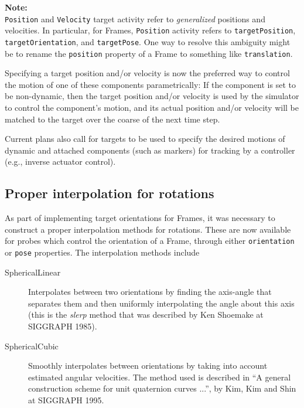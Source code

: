 \documentclass{article}
\begin{document}
\begin{sideblock}
{\bf Note:}\\
{\tt Position} and {\tt Velocity} target activity refer to {\it generalized} positions
and velocities. In particular, for Frames, {\tt Position} activity refers to
{\tt targetPosition}, {\tt targetOrientation}, and {\tt targetPose}. One way
to resolve this ambiguity might be to rename the {\tt position} property
of a Frame to something like {\tt translation}.
\end{sideblock}

Specifying a target position and/or velocity is now the preferred way
to control the motion of one of these components parametrically: If
the component is set to be non-dynamic, then the target position
and/or velocity is used by the simulator to control the component's
motion, and its actual position and/or velocity will be matched to the
target over the coarse of the next time step.

Current plans also call for targets to be used to specify the desired
motions of dynamic and attached components (such as markers) for
tracking by a controller (e.g., inverse actuator control).


\subsection*{Proper interpolation for rotations}

As part of implementing target orientations for Frames, it was
necessary to construct a proper interpolation methods for
rotations. These are now available for probes which control the
orientation of a Frame, through either {\tt orientation} or {\tt pose}
properties. The interpolation methods include

\begin{description}

\item[SphericalLinear]  \mbox{}
Interpolates between two orientations by finding the axis-angle
that separates them and then uniformly interpolating the
angle about this axis (this is the {\it slerp} method that
was described by Ken Shoemake at SIGGRAPH 1985).

\item[SphericalCubic]  \mbox{}
Smoothly interpolates between orientations by taking into account
estimated angular velocities. The method used is described in ``A
general construction scheme for unit quaternion curves ...'', by Kim,
Kim and Shin at SIGGRAPH 1995.

\end{description}
\end{document}
